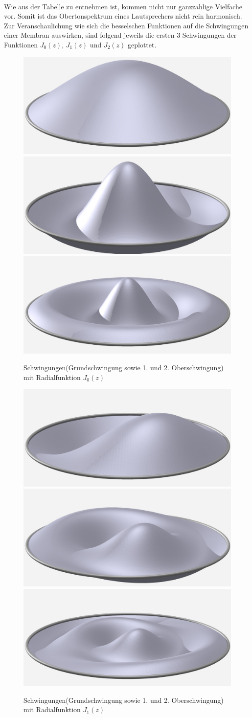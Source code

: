 \\
Wie aus der Tabelle zu entnehmen ist, kommen nicht nur ganzzahlige Vielfache vor. Somit ist das Obertonspektrum eines Lautsprechers nicht rein harmonisch.
Zur Veranschaulichung wie sich die besselschen Funktionen auf die Schwingungen einer Membran auswirken, sind folgend jeweils die ersten 3 Schwingungen der Funktionen $J_0(z)$, $J_1(z)$ und $J_2(z)$ geplottet.
\begin{figure}
        \includegraphics[width=0.33\hsize]{./kreis/membran/circle-1-0.jpg}
        \includegraphics[width=0.33\hsize]{./kreis/membran/circle-2-0.jpg}
        \includegraphics[width=0.33\hsize]{./kreis/membran/circle-3-0.jpg}
        \caption{Schwingungen(Grundschwingung sowie 1. und 2. Oberschwingung) mit Radialfunktion $J_0(z)$}
        \label{fig:membranj0}
\end{figure}
\begin{figure}
        \includegraphics[width=0.33\hsize]{./kreis/membran/circle-1-1.jpg}
        \includegraphics[width=0.33\hsize]{./kreis/membran/circle-2-1.jpg}
        \includegraphics[width=0.33\hsize]{./kreis/membran/circle-3-1.jpg}
        \caption{Schwingungen(Grundschwingung sowie 1. und 2. Oberschwingung) mit Radialfunktion $J_1(z)$}
        \label{fig:membranj1}
\end{figure}
